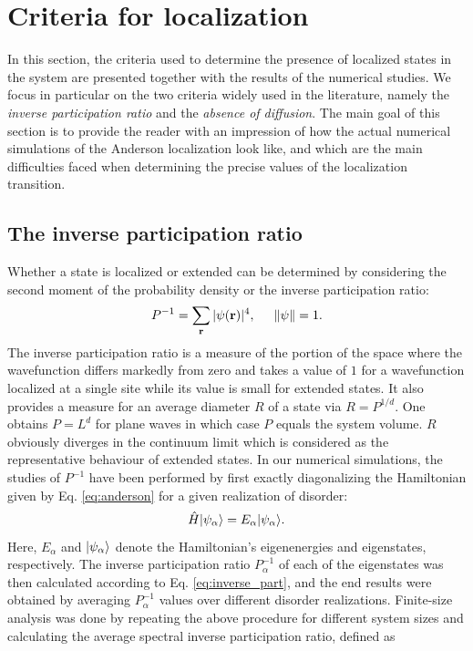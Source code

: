 \documentclass[10pt,a4paper]{article}
\begin{document}
 \section{Criteria for localization}
 \label{sec:criteria}
In this section, the criteria used to determine the presence of localized states in the system are presented together with the results of the numerical studies. We focus in particular on the two criteria widely used in the literature, namely the \emph{inverse participation ratio} and the \emph{absence of diffusion}. The main goal of this section is to provide the reader with an impression of how the actual numerical simulations of the Anderson localization look like, and which are the main difficulties faced when determining the precise values of the localization transition.
\subsection{The inverse participation ratio}
\noindent Whether a state is localized or extended can be determined by considering the second moment of the probability density or the inverse participation ratio:
\begin{equation}\label{eq:inverse_part}
P^{-1}=\sum\limits_\mathbf{r} |\psi(\textbf{r})|^4, \hspace{5mm} \left\Vert \psi \right\Vert=1.
\end{equation}
The inverse participation ratio is a measure of the portion of the space where the wavefunction differs markedly from zero and takes a value of $1$ for a wavefunction localized at a single site while its value is small for extended states. It also provides a measure for an average diameter $R$ of a state via $R=P^{1/d}$. One obtains $P=L^d$ for plane waves in which case $P$ equals the system volume. $R$ obviously diverges in the continuum limit which is considered as the representative behaviour of extended states. In our numerical simulations, the studies of $P^{-1}$ have been performed by first exactly diagonalizing the Hamiltonian given by Eq. \eqref{eq:anderson} for a given realization of disorder:
\begin{equation}\label{eq:diagonalizacija}
\hat{H}\vert\psi_\alpha\rangle = E_\alpha\vert\psi_\alpha\rangle.
\end{equation}
Here, $E_\alpha$ and $\vert\psi_\alpha\rangle$ denote the Hamiltonian's eigenenergies and eigenstates, respectively. The inverse participation ratio $P^{-1}_\alpha$ of each of the eigenstates was then calculated according to Eq. \eqref{eq:inverse_part}, and the end results were obtained by averaging $P_\alpha^{-1}$ values over different disorder realizations. Finite-size analysis was done by repeating the above procedure for different system sizes and calculating the average spectral inverse participation ratio, defined as 
\end{document}
